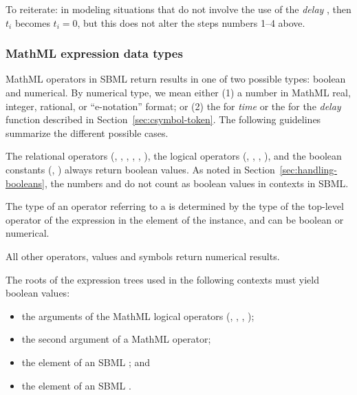 To reiterate: in modeling situations that do not involve the use
of the \emph{delay} , then $t_i$ becomes $t_i = 0$,
but this does not alter the steps numbers 1--4 above.


\subsubsection{MathML expression data types}
\label{sec:mathmltype}

MathML operators in SBML return results in one of two
possible types: boolean and numerical.  By numerical type,
we mean either (1) a number in MathML real, integer, rational, or
``e-notation'' format; or (2) the  for \emph{time}
or the  for the \emph{delay} function described in
Section~\ref{sec:csymbol-token}.  The following guidelines
summarize the different possible cases.

The relational operators (, , ,
, , ), the logical operators
(, , , ), and the
boolean constants (, ) always return
boolean values.  As noted in
  Section~\ref{sec:handling-booleans}, the numbers  and
   do not count as boolean values in \mathml
  contexts in SBML.

The type of an operator referring to a \FunctionDefinition is
determined by the type of the top-level operator of the expression
in the  element of the \FunctionDefinition
instance, and can be boolean or numerical.

All other operators, values and symbols return numerical
results.

The roots of the expression trees used in the following contexts
must yield boolean values:

\begin{itemize}\setlength{\parskip}{-0.2ex}

\item the arguments of the MathML logical operators (,
, , );

\item the second argument of a MathML  operator;

\item the  element of an SBML \Event; and

\item the  element of an SBML \Constraint.

\end{itemize}

